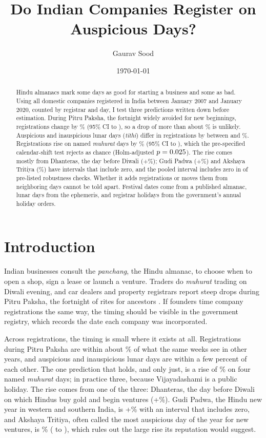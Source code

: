 \documentclass[12pt,letterpaper]{article}
\title{Do Indian Companies Register on Auspicious Days?}
\author{Gaurav Sood}
\date{\today}
\newcommand{\tithi}{\textit{tithi}}
\newcommand{\panchang}{\textit{panchang}}
\newcommand{\muhurat}{\textit{muhurat}}
\begin{document}
\maketitle

\begin{abstract}
\noindent Hindu almanacs mark some days as good for starting a business and some as bad. Using all \NDomestic{} domestic companies registered in India between January 2007 and January 2020, counted by registrar and day, I test three predictions written down before estimation. During Pitru Paksha, the fortnight widely avoided for new beginnings, registrations change by \POnePct\% (95\% CI \POneLo{} to \POneHi), so a drop of more than about \POneLoAbs\% is unlikely. Auspicious and inauspicious lunar days (\tithi) differ in registrations by between \PThreeGapLo{} and \PThreeGapHi\%. Registrations rise on named \muhurat{} days by \PTwoPct\% (95\% CI \PTwoLo{} to \PTwoHi), which the pre-specified calendar-shift test rejects as chance (Holm-adjusted $p = 0.025$). The rise comes mostly from Dhanteras, the day before Diwali (+\DhanterasPct\%); Gudi Padwa (+\GudiPct\%) and Akshaya Tritiya (\AksPct\%) have intervals that include zero, and the pooled interval includes zero in \RobPTwoInclZero{} of \RobN{} pre-listed robustness checks. Whether it adds registrations or moves them from neighboring days cannot be told apart. Festival dates come from a published almanac, lunar days from the ephemeris, and registrar holidays from the government's annual holiday orders.
\end{abstract}

\section{Introduction}

Indian businesses consult the \panchang, the Hindu almanac, to choose when to open a shop, sign a lease or launch a venture. Traders do \muhurat{} trading on Diwali evening, and car dealers and property registrars report steep drops during Pitru Paksha, the fortnight of rites for ancestors \citep{bs2014pitru}. If founders time company registrations the same way, the timing should be visible in the government registry, which records the date each company was incorporated.

Across \NDomestic{} registrations, the timing is small where it exists at all. Registrations during Pitru Paksha are within about \POneLoAbs\% of what the same weeks see in other years, and auspicious and inauspicious lunar days are within a few percent of each other. The one prediction that holds, and only just, is a rise of \PTwoPct\% on four named \muhurat{} days; in practice three, because Vijayadashami is a public holiday. The rise comes from one of the three: Dhanteras, the day before Diwali on which Hindus buy gold and begin ventures (+\DhanterasPct\%). Gudi Padwa, the Hindu new year in western and southern India, is +\GudiPct\% with an interval that includes zero, and Akshaya Tritiya, often called the most auspicious day of the year for new ventures, is \AksPct\% (\AksLo{} to \AksHi), which rules out the large rise its reputation would suggest.
\end{document}
